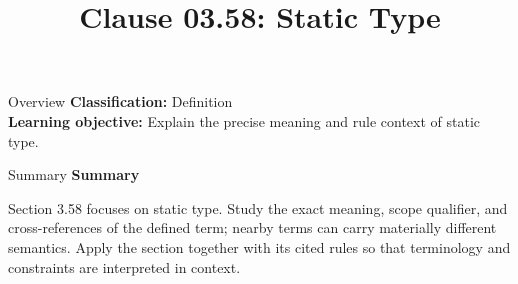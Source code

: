 \documentclass[10pt,letterpaper]{article}
\title{Clause 03.58: Static Type}
\author{}
\date{}
\begin{document}
\maketitle
\begin{CornellOverviewBox}{Overview}
\textbf{Classification:} Definition\\[2pt]
\textbf{Learning objective:} Explain the precise meaning and rule context of static type.
\end{CornellOverviewBox}\begin{CornellSummaryBox}{Summary}
{\sffamily\bfseries\color{Accent} Summary}\par\vspace{3pt}Section 3.58 focuses on static type. Study the exact meaning, scope qualifier, and cross-references of the defined term; nearby terms can carry materially different semantics. Apply the section together with its cited rules so that terminology and constraints are interpreted in context.
\end{CornellSummaryBox}
\end{document}

